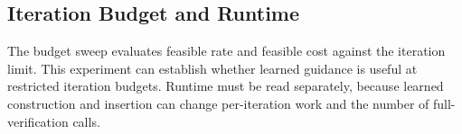 \subsection{Iteration Budget and Runtime}
The budget sweep evaluates feasible rate and feasible cost against the
iteration limit. This experiment can establish whether learned guidance is
useful at restricted iteration budgets. Runtime must be read separately,
because learned construction and insertion can change per-iteration work and
the number of full-verification calls.


